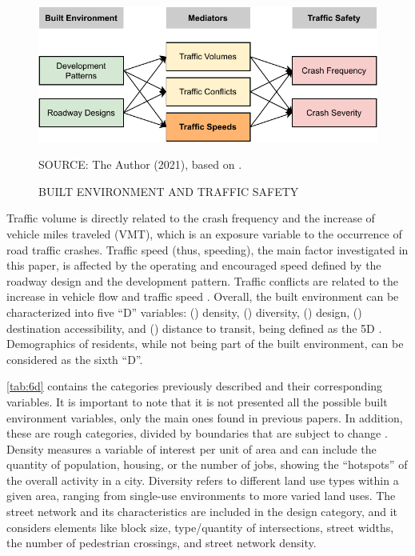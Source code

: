 \begin{figure}[!htbp]
    \centering\footnotesize
    \captionsetup{font=footnotesize}
    \caption{BUILT ENVIRONMENT AND TRAFFIC SAFETY}
    \includegraphics{fig/ewing.pdf}
    \label{fig:ewing}
    \par SOURCE: The Author (2021), based on \textcite{Ewing2009}.
\end{figure}

Traffic volume is directly related to the crash frequency and the increase of vehicle miles traveled (VMT), which is an exposure variable to the occurrence of road traffic crashes. Traffic speed (thus, speeding), the main factor investigated in this paper, is affected by the operating and encouraged speed defined by the roadway design and the development pattern. Traffic conflicts are related to the increase in vehicle flow and traffic speed \cite{Ewing2009}. Overall, the built environment can be characterized into five ``D'' variables: () density, () diversity, () design, () destination accessibility, and () distance to transit, being defined as the 5D \cite{Ewing2010}. Demographics of residents, while not being part of the built environment, can be considered as the sixth ``D''. 





\autoref{tab:6d} contains the categories previously described and their corresponding variables. It is important to note that it is not presented all the possible built environment variables, only the main ones found in previous papers. In addition, these are rough categories, divided by boundaries that are subject to change \cite{Ewing2010}. Density measures a variable of interest per unit of area and can include the quantity of population, housing, or the number of jobs, showing the ``hotspots'' of the overall activity in a city. Diversity refers to different land use types within a given area, ranging from single-use environments to more varied land uses. The street network and its characteristics are included in the design category, and it considers elements like block size, type/quantity of intersections, street widths, the number of pedestrian crossings, and street network density.


